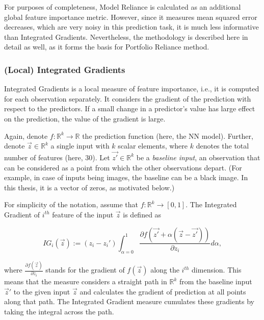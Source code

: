 		For purposes of completeness, Model Reliance is calculated as an additional global feature importance metric. However, since it measures mean squared error decreases, which are very noisy in this prediction task, it is much less informative than Integrated Gradients. Nevertheless, the methodology is described here in detail as well, as it forms the basis for Portfolio Reliance method. 
		
		\subsubsection{(Local) Integrated Gradients}
			\label{chap:integrated_gradient}
			Integrated Gradients \citep{sundararajan2017axiomatic} is a local measure of feature importance, i.e., it is computed for each observation separately. It considers the gradient of the prediction with respect to the predictors. If a small change in a predictor's value has large effect on the prediction, the value of the gradient is large.
			
			Again, denote $f: \mathbb{R}^k \rightarrow \mathbb{R}$ the prediction function (here, the NN model). Further, denote $\vec{z} \in  \mathbb{R}^k$ a single input with $k$ scalar elements, where $k$ denotes the total number of features (here, 30). Let $\vec{z'} \in  \mathbb{R}^k$ be a \textit{baseline input}, an observation that can be considered as a point from which the other observations depart. (For example, in case of inputs being images, the baseline can be a black image. In this thesis, it is a vector of zeros, as motivated below.) 
			
			For simplicity of the notation, assume that $f: \mathbb{R}^k \rightarrow [0,1]$. The Integrated Gradient of $i^{th}$ feature of the input $\vec{z}$ is defined as 
			
			\begin{equation*}
				IG_i(\vec{z}) := (z_i - z_i') \int_{\alpha=0}^{1} \frac{\partial f(\vec{z'} + \alpha(\vec{z}-\vec{z'}))}{\partial z_i}d\alpha,
			\end{equation*}
			
			where $\frac{\partial f(\vec{z})}{\partial z_i}$ stands for the gradient of $f(\vec{z})$ along the $i^{th}$ dimension. This means that the measure considers a straight path in $\mathbb{R}^k$ from the baseline input ${\vec{z}'}$ to the given input ${\vec{z}}$ and calculates the gradient of prediction at all points along that path. The Integrated Gradient measure cumulates these gradients by taking the integral across the path.  
			
